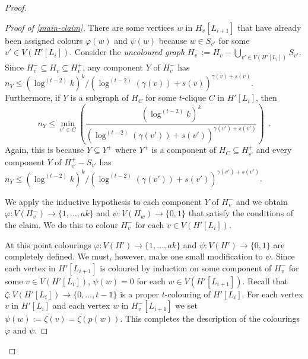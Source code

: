 \documentclass[kpfonts]{patmorin}
\theoremstyle{named}
\begin{document}
\begin{proof}
\begin{proof}[Proof of \cref{main-claim}]
       There are some vertices $w$ in $H_v[L_{i+1}]$ that have already been assigned colours $\varphi(w)$ and $\psi(w)$ because $w\in S_{v'}$ for some $v'\in V(H'[L_i])$.  Consider the \emph{uncoloured graph} $H^-_v:=H_v-\bigcup_{v'\in V(H'[L_i])} S_{v'}$.  Since $H^-_v\subseteq H_v\subseteq H^+_v$, any component $Y$ of $H^-_v$ has $n_Y\le (\log^{(t-2)} k)^k/(\log^{(t-2)} (\gamma(v))+s(v))^{\gamma(v)+s(v)}$.  Furthermore, if $Y$ is a subgraph of $H_C$ for some $t$-clique $C$ in $H'[L_i]$, then
       \begin{equation}
        n_Y \le \min_{v'\in C}\left(\frac{(\log^{(t-2)}k)^k}{(\log^{(t-2)} (\gamma(v'))+s(v'))^{\gamma(v')+s(v')}} \right) \enspace . \label{min}
        \end{equation}
       Again, this is because $Y\subseteq Y^+$ where $Y^+$ is a component of $H_C\subseteq H^+_{v'}$ and every component $Y$ of $H^+_{v'}-S_{v'}$ has $n_Y\le (\log^{(t-2)}k)^k/(\log^{(t-2)} (\gamma(v'))+s(v'))^{\gamma(v')+s(v')}$.

       We apply the inductive hypothesis to each component $Y$ of $H^-_v$ and we obtain $\varphi:V(H^-_v)\to\{1,\ldots,ak\}$ and $\psi:V(H_w)\to\{0,1\}$ that satisfy the conditions of the claim.  We do this to colour $H^-_v$ for each $v\in V(H'[L_i])$.


       At this point colourings $\varphi:V(H')\to\{1,\ldots,ak\}$ and $\psi:V(H')\to\{0,1\}$ are completely defined.  We must, however, make one small modification to $\psi$.  Since each vertex in $H'[L_{i+1}]$ is coloured by induction on some component of $H^-_v$ for some $v\in V(H'[L_i])$, $\psi(w)=0$ for each $w\in V(H'[L_{i+1}])$.
       Recall that $\zeta:V(H'[L_i])\to\{0,\ldots,t-1\}$ is a proper $t$-colouring of $H'[L_i]$.  For each vertex $v$ in $H'[L_i]$ and each vertex $w$ in $H^-_v[L_{i+1}]$ we set $\psi(w):=\zeta(v)=\zeta(p(w))$.  This completes the description of the colourings $\varphi$ and $\psi$.


\end{proof}
\end{proof}
\end{document}
